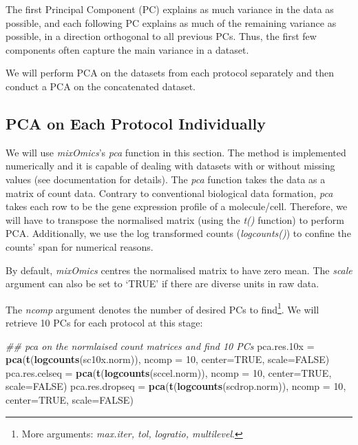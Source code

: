 \documentclass[]{book}
\newenvironment{Shaded}{\begin{snugshade}}{\end{snugshade}}
\newcommand{\CommentTok}[1]{\textcolor[rgb]{0.56,0.35,0.01}{\textit{#1}}}
\newcommand{\DataTypeTok}[1]{\textcolor[rgb]{0.13,0.29,0.53}{#1}}
\newcommand{\DecValTok}[1]{\textcolor[rgb]{0.00,0.00,0.81}{#1}}
\newcommand{\FloatTok}[1]{\textcolor[rgb]{0.00,0.00,0.81}{#1}}
\newcommand{\KeywordTok}[1]{\textcolor[rgb]{0.13,0.29,0.53}{\textbf{#1}}}
\newcommand{\NormalTok}[1]{#1}
\newcommand{\OtherTok}[1]{\textcolor[rgb]{0.56,0.35,0.01}{#1}}
\newcommand{\StringTok}[1]{\textcolor[rgb]{0.31,0.60,0.02}{#1}}
\let\rmarkdownfootnote\footnote%
\def\footnote{\protect\rmarkdownfootnote}
\theoremstyle{definition}
\theoremstyle{definition}
\theoremstyle{definition}
\theoremstyle{remark}
\begin{document}
The first Principal Component (PC) explains as much variance in the data
as possible, and each following PC explains as much of the remaining
variance as possible, in a direction orthogonal to all previous PCs.
Thus, the first few components often capture the main variance in a
dataset.

We will perform PCA on the datasets from each protocol separately and
then conduct a PCA on the concatenated dataset.

\hypertarget{pca-on-each-protocol-individually}{%
\subsection{PCA on Each Protocol
Individually}\label{pca-on-each-protocol-individually}}

We will use \emph{mixOmics}'s \emph{pca} function in this section. The
method is implemented numerically and it is capable of dealing with
datasets with or without missing values (see documentation for details).
The \emph{pca} function takes the data as a matrix of count data.
Contrary to conventional biological data formation, \emph{pca} takes
each row to be the gene expression profile of a molecule/cell.
Therefore, we will have to transpose the normalised matrix (using the
\emph{t()} function) to perform PCA. Additionally, we use the log
transformed counts (\emph{logcounts()}) to confine the counts' span for
numerical reasons.

By default, \emph{mixOmics} centres the normalised matrix to have zero
mean. The \emph{scale} argument can also be set to `TRUE' if there are
diverse units in raw data.

The \emph{ncomp} argument denotes the number of desired PCs to
find\footnote{More arguments: \emph{max.iter, tol, logratio,
  multilevel}.}. We will retrieve 10 PCs for each protocol at this
stage:

\begin{Shaded}
\begin{Highlighting}[]
\CommentTok{## pca on the normlaised count matrices and find 10 PCs}
\NormalTok{pca.res}\FloatTok{.10}\NormalTok{x =}\StringTok{     }\KeywordTok{pca}\NormalTok{(}\KeywordTok{t}\NormalTok{(}\KeywordTok{logcounts}\NormalTok{(sc10x.norm)),  }\DataTypeTok{ncomp =} \DecValTok{10}\NormalTok{,}
                      \DataTypeTok{center=}\OtherTok{TRUE}\NormalTok{, }\DataTypeTok{scale=}\OtherTok{FALSE}\NormalTok{)}
\NormalTok{pca.res.celseq =}\StringTok{  }\KeywordTok{pca}\NormalTok{(}\KeywordTok{t}\NormalTok{(}\KeywordTok{logcounts}\NormalTok{(sccel.norm)),  }\DataTypeTok{ncomp =} \DecValTok{10}\NormalTok{,}
                      \DataTypeTok{center=}\OtherTok{TRUE}\NormalTok{, }\DataTypeTok{scale=}\OtherTok{FALSE}\NormalTok{)}
\NormalTok{pca.res.dropseq =}\StringTok{ }\KeywordTok{pca}\NormalTok{(}\KeywordTok{t}\NormalTok{(}\KeywordTok{logcounts}\NormalTok{(scdrop.norm)), }\DataTypeTok{ncomp =} \DecValTok{10}\NormalTok{,}
                      \DataTypeTok{center=}\OtherTok{TRUE}\NormalTok{, }\DataTypeTok{scale=}\OtherTok{FALSE}\NormalTok{)}
\end{Highlighting}
\end{Shaded}
\end{document}
